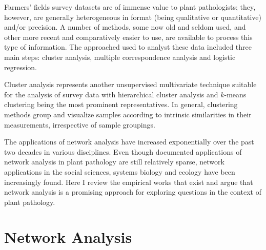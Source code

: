 \documentclass[12pt, oneside]{report}
\begin{document}
Farmers' fields survey datasets are of immense value to plant pathologists; they, however, are generally heterogeneous in format (being qualitative or quantitative) and/or precision. A number of methods, some now old and seldom used, and other more recent and comparatively easier to use, are available to process this type of information. The approached used to analyst these data included three main steps: cluster analysis, multiple correspondence analysis and logistic regression.

Cluster analysis represents another unsupervised multivariate technique suitable for the analysis of survey data with hierarchical cluster analysis and $k$-means clustering  being the most prominent representatives. In general, clustering methods group and visualize samples according to intrinsic similarities in their measurements, irrespective of sample groupings. 





The applications of network analysis have increased exponentially over the past two decades in various disciplines. Even though documented applications of network analysis in plant pathology are still relatively sparse, network applications in the social sciences, systems biology and ecology have been increasingly found. Here I review the empirical works that exist and argue that network analysis is a promising approach for exploring questions in the context of plant pathology.





\section*{Network Analysis}
\end{document}
